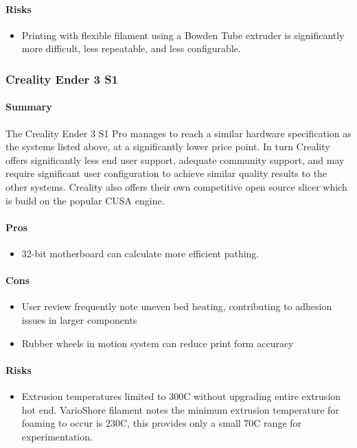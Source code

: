 \documentclass[11pt]{article}
\begin{document}
\paragraph{Risks}
\label{sec:org46065aa}
\begin{itemize}
\item Printing with flexible filament using a Bowden Tube extruder is significantly more difficult, less repeatable, and less configurable.
\end{itemize}

\subsubsection{Creality Ender 3 S1}
\label{sec:org112ac47}

\paragraph{Summary}
\label{sec:org91e66f3}
The Creality Ender 3 S1 Pro manages to reach a similar hardware specification as the systems listed above, at a significantly lower price point. In turn Creality offers significantly less end user support, adequate community support, and may require significant user configuration to achieve similar quality results to the other systems. Creality also offers their own competitive open source slicer which is build on the popular CUSA engine.

\paragraph{Pros}
\label{sec:org66c9158}
\begin{itemize}
\item 32-bit motherboard can calculate more efficient pathing.
\end{itemize}

\paragraph{Cons}
\label{sec:org6fc5832}
\begin{itemize}
\item User review frequently note uneven bed heating, contributing to adhesion issues in larger components
\item Rubber wheels in motion system can reduce print form accuracy
\end{itemize}

\paragraph{Risks}
\label{sec:org4d3918a}
\begin{itemize}
\item Extrusion temperatures limited to 300C without upgrading entire extrusion hot end. VarioShore filament notes the minimum extrusion temperature for foaming to occur is 230C, this provides only a small 70C range for experimentation.
\end{itemize}
\end{document}
